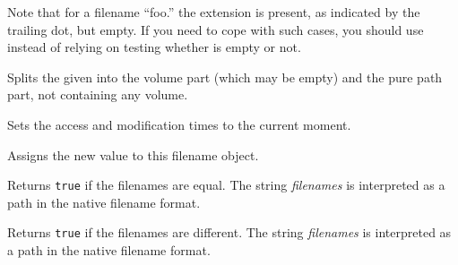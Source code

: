 Note that for a filename ``foo.'' the extension is present, as indicated by the
trailing dot, but empty. If you need to cope with such cases, you should use 
 instead of relying on testing whether  is empty or not.


\label{wxfilenamesplitvolume}


Splits the given  into the volume part (which may be empty) and
the pure path part, not containing any volume.




\label{wxfilenametouch}


Sets the access and modification times to the current moment.


\label{wxfilenameoperatorassign}



Assigns the new value to this filename object.


\label{wxfilenameoperatorequal}



Returns {\tt true} if the filenames are equal. The string {\it filenames} is
interpreted as a path in the native filename format.


\label{wxfilenameoperatornotequal}



Returns {\tt true} if the filenames are different. The string {\it filenames}
is interpreted as a path in the native filename format.

